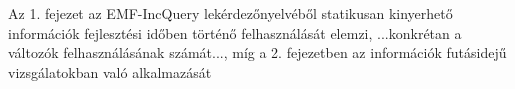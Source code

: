 


Az 1. fejezet az EMF-IncQuery lekérdezőnyelvéből statikusan kinyerhető információk fejlesztési időben történő felhasználását elemzi, ...konkrétan a változók felhasználásának számát..., míg a 2. fejezetben az információk futásidejű vizsgálatokban való alkalmazását


